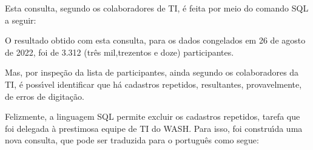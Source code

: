 \documentclass[
12pt,		%
openright,	%
twoside,  %
a4paper,			%
chapter=TITLE,		%
english,			%
french,				%
spanish,			%
brazil				%
]{USPSC-classe/USPSC}
\begin{document}
Esta consulta, segundo os colaboradores de TI, \'e feita por meio do comando SQL a seguir:










\noindent\begin{center}\mbox{\centering{}}\end{center}












O resultado obtido com esta consulta, para os dados congelados em 26 de agosto de 2022, foi de 3.312 (tr\^es mil,trezentos e doze) participantes.









Mas, por inspe\c{c}\~ao da lista de participantes, ainda segundo os colaboradores da TI, \'e poss\'{\i}vel identificar que h\'a cadastros repetidos, resultantes, provavelmente, de erros de digita\c{c}\~ao.









Felizmente, a linguagem SQL permite excluir os cadastros repetidos, tarefa que foi delegada \`a prestimosa equipe de TI do WASH. Para isso, foi constru\'{\i}da uma nova consulta, que pode ser traduzida para o portugu\^es como segue:










\noindent\begin{center}\mbox{\centering{}}\end{center}
\end{document}
